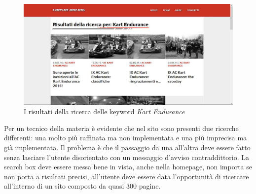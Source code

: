 	\begin{figure} [h]
		\centering
		\includegraphics[width=\textwidth]{images/SearchResult}
		\caption{I risultati della ricerca delle keyword \textit{Kart Endurance}}
		\label{fig:RicercaRisultati}
	\end{figure}
	
	Per un tecnico della materia è evidente che nel sito sono presenti due ricerche differenti: una molto più raffinata ma non implementata e una più imprecisa ma già implementata. Il problema è che il passaggio da una all'altra deve essere fatto senza lasciare l'utente disorientato con un messaggio d'avviso contraddittorio. 
	La search box deve essere messa bene in vista, anche nella homepage, non importa se non porta a risultati precisi, all'utente deve essere data l'opportunità di ricercare all'interno di un sito composto da quasi 300 pagine.